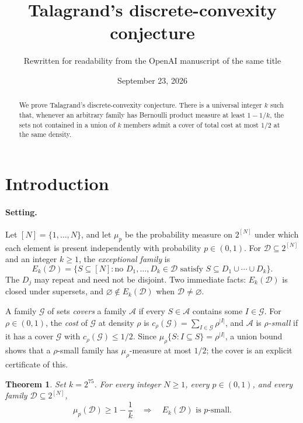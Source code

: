 \documentclass[11pt,letterpaper]{article}
\title{Talagrand's discrete-convexity conjecture}
\author{Rewritten for readability from the OpenAI manuscript of the same title}
\date{September 23, 2026}
\newtheorem{theorem}{Theorem}[section]
\theoremstyle{definition}
\theoremstyle{remark}
\numberwithin{equation}{section}
\begin{document}
\maketitle
\begin{abstract}
We prove Talagrand's discrete-convexity conjecture.
There is a universal integer $k$ such that, whenever an arbitrary family has
Bernoulli product measure at least $1-1/k$, the sets not contained
in a union of $k$ members admit a cover of total cost at most $1/2$
at the same density.
\end{abstract}

\section{Introduction}
\label{sec:introduction}

\paragraph{Setting.}
Let $[N]=\{1,\ldots,N\}$, and let $\mu_p$ be the probability measure on
$2^{[N]}$ under which each element is present independently with
probability $p\in(0,1)$. For $\mathcal D\subseteq2^{[N]}$ and an integer
$k\ge1$, the \emph{exceptional family} is
\begin{equation}
\label{eq:exceptional-definition}
E_k(\mathcal D)
=\bigl\{S\subseteq[N]:\text{no }D_1,\ldots,D_k\in\mathcal D
\text{ satisfy }S\subseteq D_1\cup\cdots\cup D_k\bigr\}.
\end{equation}
The $D_j$ may repeat and need not be disjoint. Two immediate facts:
$E_k(\mathcal D)$ is closed under supersets, and
$\varnothing\notin E_k(\mathcal D)$ when $\mathcal D\ne\varnothing$.

A family $\mathcal G$ of sets \emph{covers} a family $\mathcal A$ if every
$S\in\mathcal A$ contains some $I\in\mathcal G$. For $\rho\in(0,1)$, the
\emph{cost} of $\mathcal G$ at density $\rho$ is
$c_\rho(\mathcal G)=\sum_{I\in\mathcal G}\rho^{|I|}$, and $\mathcal A$ is
\emph{$\rho$-small} if it has a cover $\mathcal G$ with
$c_\rho(\mathcal G)\le1/2$. Since $\mu_\rho\{S:I\subseteq S\}=\rho^{|I|}$,
a union bound shows that a $\rho$-small family has $\mu_\rho$-measure at
most $1/2$; the cover is an explicit certificate of this.

\begin{theorem}
\label{thm:main}
Set $k=2^{75}$. For every integer $N\ge1$, every $p\in(0,1)$, and every
family $\mathcal D\subseteq2^{[N]}$,
\[
\mu_p(\mathcal D)\ge1-\frac1k
\quad\Longrightarrow\quad
E_k(\mathcal D)\text{ is }p\text{-small}.
\]
\end{theorem}
\end{document}
